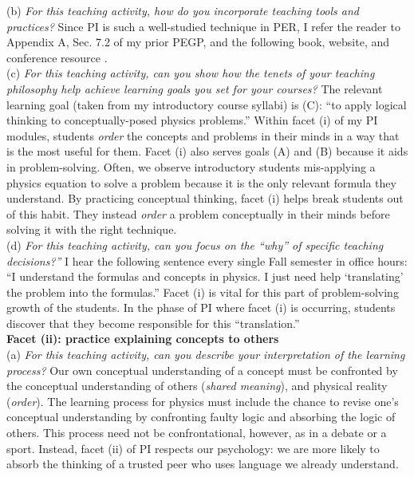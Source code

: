 \documentclass[../../../main.tex]{subfiles}
\begin{document}
\vspace{0.25cm}
(b) \textit{For this teaching activity, how do you incorporate teaching tools and practices?}  Since PI is such a well-studied technique in PER, I refer the reader to Appendix A, Sec. 7.2 of my prior PEGP, and the following book, website, and conference resource \cite{mazur2013peer,PhysPort,AAPTPI}.
\\
\vspace{0.25cm}
(c) \textit{For this teaching activity, can you show how the tenets of your teaching philosophy help achieve learning goals you set for your courses?}  The relevant learning goal (taken from my introductory course syllabi) is (C): ``to apply logical thinking to conceptually-posed physics problems.''  Within facet (i) of my PI modules, students \textit{order} the concepts and problems in their minds in a way that is the most useful for them.  Facet (i) also serves goals (A) and (B) because it aids in problem-solving.  Often, we observe introductory students mis-applying a physics equation to solve a problem because it is the only relevant formula they understand.  By practicing conceptual thinking, facet (i) helps break students out of this habit.  They instead \textit{order} a problem conceptually in their minds before solving it with the right technique.
\\
\vspace{0.25cm}
(d) \textit{For this teaching activity, can you focus on the ``why'' of specific teaching decisions?''}  I hear the following sentence every single Fall semester in office hours: ``I understand the formulas and concepts in physics.  I just need help `translating' the problem into the formulas.''  Facet (i) is vital for this part of problem-solving growth of the students.  In the phase of PI where facet (i) is occurring, students discover that they become responsible for this ``translation.''
\\
\vspace{0.25cm}
\textbf{Facet (ii): practice explaining concepts to others} 
\\
\vspace{0.25cm}
(a) \textit{For this teaching activity, can you describe your interpretation of the learning process?} Our own conceptual understanding of a concept must be confronted by the conceptual understanding of others (\textit{shared meaning}), and physical reality (\textit{order}).  The learning process for physics must include the chance to revise one's conceptual understanding by confronting faulty logic and absorbing the logic of others.  This process need not be confrontational, however, as in a debate or a sport.  Instead, facet (ii) of PI respects our psychology: we are more likely to absorb the thinking of a trusted peer who uses language we already understand.
\end{document}
